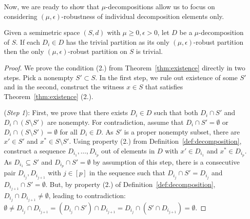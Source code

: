 Now, we are ready to show that $\mu$-decompositions allow us to focus on considering $(\mu, \epsilon)$-robustness of individual decomposition elements only.

\begin{theorem}
\label{thm:decomposition}
    Given a semimetric space $(S, d)$ with $\mu \geq 0, \epsilon > 0$, let $D$ be a $\mu$-decomposition of $S$. If each $D_i \in D$ has the trivial partition as its only $(\mu, \epsilon)$-robust partition then the only $(\mu, \epsilon)$-robust partition on $S$ is trivial.
\end{theorem}
\begin{proof}   
    We prove the condition (2.) from Theorem~\ref{thm:existence} directly in two steps. Pick a nonempty $S' \subset S$. In the first step, we rule out existence of some $S'$ and in the second, construct the witness $x \in S$ that satisfies Theorem~\ref{thm:existence} (2.).
    
    (\emph{Step 1}): 
    First, we prove that there exists $D_i \in D$ such that both $D_i \cap S'$ and $D_i \cap (S \setminus S')$ are nonempty. For contradiction, assume that $D_i \cap S' = \emptyset$ or $D_i \cap (S \setminus S') = \emptyset$ for all $D_i \in D$. As $S'$ is a proper nonempty subset, there are $x' \in S'$ and $x^* \in S \setminus S'$. Using property (2.) from Definition~\ref{def:decomposition}, construct a sequence $D_{i_1}, \dots, D_{i_p}$ out of elements in $D$ with $x' \in D_{i_1}$ and $x^* \in D_{i_p}$. As $D_{i_1} \subseteq S'$ and $D_{i_p} \cap S' = \emptyset$ by assumption of this step, there is a consecutive pair $D_{i_j}, D_{i_{j + 1}}$  with $j \in [p]$ in the sequence such that $D_{i_j} \cap S' = D_{i_j}$ and $D_{i_{j + 1}} \cap S' = \emptyset$. But, by property (2.) of Definition~\ref{def:decomposition}, $D_{i_j} \cap D_{i_{j + 1}} \neq \emptyset$, leading to contradiction: $\emptyset \neq D_{i_j} \cap D_{i_{j + 1}} = (D_{i_j} \cap S') \cap D_{i_{j + 1}} = D_{i_j} \cap (S' \cap D_{i_{j + 1}}) = \emptyset$.


\end{proof}
